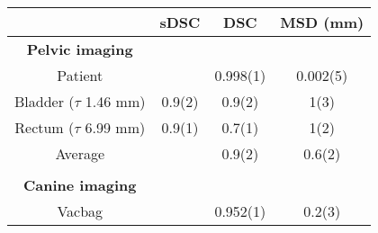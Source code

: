 \begin{table}[h]
\footnotesize
\centering
\begin{tabular}{c c c c}
              & sDSC  & DSC         & MSD (mm)   \\
\hline
\textbf{Pelvic imaging}      &              &              &       \\
Patient                      &              & 0.998(1) & 0.002(5)  \\
Bladder ($\tau$ 1.46 mm)     & 0.9(2)     & 0.9(2)     & 1(3)       \\
Rectum ($\tau$ 6.99 mm)      & 0.9(1)     & 0.7(1)     & 1(2)       \\
Average                      &              & 0.9(2)     & 0.6(2)   \\ \\
\textbf{Canine imaging}      &              &              &           \\
Vacbag                       &              & 0.952(1) & 0.2(3)    \\
\hline
\end{tabular}
\label{table:organ}
\end{table}
